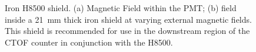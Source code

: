 \documentclass[12pt]{article}
\begin{document}
\begin{figure}[htbp]
\centering
{}
\qquad
{}
\caption{\small{Iron H8500 shield. (a) Magnetic Field within the PMT; (b)
field inside  a 21~mm thick iron shield at varying external magnetic fields. 
This shield is recommended for use in the downstream region of the CTOF counter in 
conjunction with the H8500.}}
\label{Upstream_Iron_21mm}
\end{figure}
%
%
\end{document}
